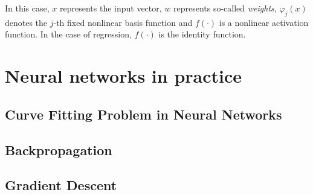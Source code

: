 In this case, $x$ represents the input vector, $w$ represents so-called \emph{weights}, $\varphi_j(x)$ denotes the $j$-th fixed nonlinear basis function and $f(\cdot)$ is a nonlinear activation function. In the case of regression, $f(\cdot)$ is the identity function.



\section{Neural networks in practice}

\subsection{Curve Fitting Problem in Neural Networks}


\subsection{Backpropagation}


\subsection{Gradient Descent}



